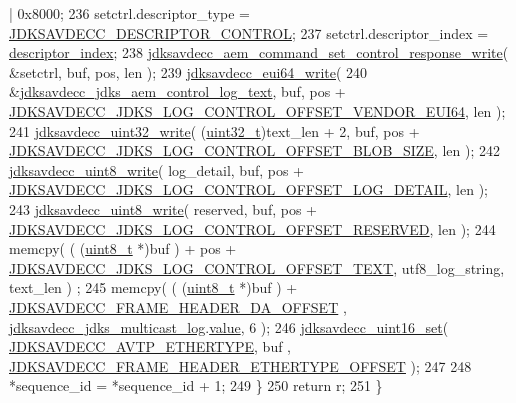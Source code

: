 \begin{DoxyCode}
       | 0x8000;
236         setctrl.descriptor\_type = \hyperlink{group__descriptor_gaafb6bdc564bbe2b62cb6f91bdb8185a8}{JDKSAVDECC\_DESCRIPTOR\_CONTROL};
237         setctrl.descriptor\_index = \hyperlink{structjdksavdecc__aem__command__set__control__response_a042bbc76d835b82d27c1932431ee38d4}{descriptor\_index};
238         \hyperlink{group__command__set__control__response_ga1baf427e932ebec21bb6bc41e2fb4d74}{jdksavdecc\_aem\_command\_set\_control\_response\_write}(
       &setctrl, buf, pos, len );
239         \hyperlink{group__eui64_ga9a35f8b0a8e81f3f169892e3d0f3c7ad}{jdksavdecc\_eui64\_write}(
240             &\hyperlink{group__jdks__log_ga492c3be3079a48fdf9366bdc514c0333}{jdksavdecc\_jdks\_aem\_control\_log\_text}, buf, pos + 
      \hyperlink{group__jdks__log_gaa09f0dec1864081c2abbc426b9e387fd}{JDKSAVDECC\_JDKS\_LOG\_CONTROL\_OFFSET\_VENDOR\_EUI64}, len );
241         \hyperlink{group__endian_ga5c8d1aadb6e4ea355503a1945cfdbb92}{jdksavdecc\_uint32\_write}( (\hyperlink{parse_8c_a6eb1e68cc391dd753bc8ce896dbb8315}{uint32\_t})text\_len + 2, buf, pos + 
      \hyperlink{group__jdks__log_ga14027480ca9c47f6e02e3d96e3e9a1ad}{JDKSAVDECC\_JDKS\_LOG\_CONTROL\_OFFSET\_BLOB\_SIZE}, len );
242         \hyperlink{group__endian_ga76773f9a39ae810aec586d2bb3b617e5}{jdksavdecc\_uint8\_write}( log\_detail, buf, pos + 
      \hyperlink{group__jdks__log_ga15244e4065b3ef420cd990e0d2e6bc0d}{JDKSAVDECC\_JDKS\_LOG\_CONTROL\_OFFSET\_LOG\_DETAIL}, len );
243         \hyperlink{group__endian_ga76773f9a39ae810aec586d2bb3b617e5}{jdksavdecc\_uint8\_write}( reserved, buf, pos + 
      \hyperlink{group__jdks__log_gad860e4d61ae3f91cd3f9799e6b1dd3c5}{JDKSAVDECC\_JDKS\_LOG\_CONTROL\_OFFSET\_RESERVED}, len );
244         memcpy( ( (\hyperlink{stdint_8h_aba7bc1797add20fe3efdf37ced1182c5}{uint8\_t} *)buf ) + pos + 
      \hyperlink{group__jdks__log_gaa3f2c42190fdfb5a9f8927254dcc38f0}{JDKSAVDECC\_JDKS\_LOG\_CONTROL\_OFFSET\_TEXT}, utf8\_log\_string, text\_len )
      ;
245         memcpy( ( (\hyperlink{stdint_8h_aba7bc1797add20fe3efdf37ced1182c5}{uint8\_t} *)buf ) + \hyperlink{group__pdu_ga1ca97f0df513588adc216b94f3ddea47}{JDKSAVDECC\_FRAME\_HEADER\_DA\_OFFSET}
      , \hyperlink{group__jdks__log_gae6aee409d176c6cbbc79c18ec2bed520}{jdksavdecc\_jdks\_multicast\_log}.\hyperlink{structjdksavdecc__eui48_a18b93f04637cf37688ec10a33a0cbc26}{value}, 6 );
246         \hyperlink{group__endian_ga14b9eeadc05f94334096c127c955a60b}{jdksavdecc\_uint16\_set}( \hyperlink{group__pdu_ga9fe7bd6b7d7b0f92f5fdbb910068197f}{JDKSAVDECC\_AVTP\_ETHERTYPE}, buf
      , \hyperlink{group__pdu_ga8dde9191880d2dd9f96462655467f90f}{JDKSAVDECC\_FRAME\_HEADER\_ETHERTYPE\_OFFSET} );
247 
248         *sequence\_id = *sequence\_id + 1;
249     \}
250     \textcolor{keywordflow}{return} r;
251 \}
\end{DoxyCode}


